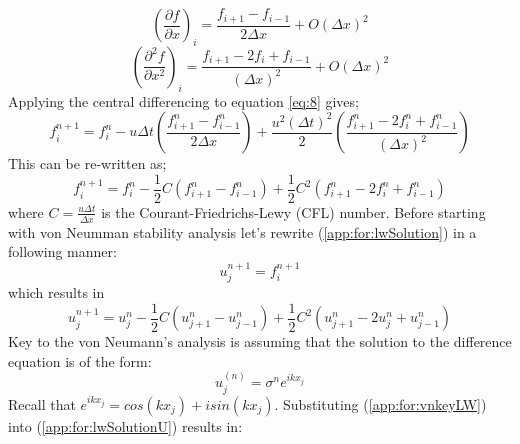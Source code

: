 	\begin{equation}
		\left(\frac{\partial f}{\partial x}\right)_{i} = \frac{f_{i+1} - f_{i-1}}{2\Delta x} + O(\Delta x)^2 
	\end{equation}
	\begin{equation}
		\left(\frac{\partial^2 f}{\partial x^2}\right)_{i} = \frac{f_{i+1} - 2f_{i} + f_{i-1}}{(\Delta x)^2} + O(\Delta x)^2 
	\end{equation} 
	Applying the central differencing to equation \eqref{eq:8} gives;
	\begin{equation}
		f^{n+1}_{i} = f^{n}_{i} - u\Delta t\left(\frac{f^{n}_{i+1} - f^{n}_{i-1}}{2\Delta x}\right) + \frac{u^2(\Delta t)^2}{2}\left(\frac{f^{n}_{i+1} - 2f^{n}_{i} + f^{n}_{i-1}}{(\Delta x)^2}\right)
	\end{equation}
	This can be re-written as;
	\begin{equation}
		\label{app:for:lwSolution}
		f^{n+1}_{i} = f^{n}_{i} -\frac{1}{2}C\left(f^{n}_{i+1} - f^{n}_{i-1}\right) + \frac{1}{2}C^2\left(f^{n}_{i+1} - 2f^{n}_{i} + f^{n}_{i-1}\right)
	\end{equation}
	where $C = \frac{u\Delta t}{\Delta x} $ is the Courant-Friedrichs-Lewy (CFL) number.
	Before starting with von Neumman stability analysis let's rewrite (\ref{app:for:lwSolution}) in a following manner:
	\begin{equation}
		u_j^{n+1} = f_i^{n+1}
	\end{equation}
	which results in
	\begin{equation}
	\label{app:for:lwSolutionU}
		u^{n+1}_{j} = u^{n}_{j} -\frac{1}{2}C\left(u^{n}_{j+1} - u^{n}_{j-1}\right) + \frac{1}{2}C^2\left(u^{n}_{j+1} - 2u^{n}_{j} + u^{n}_{j-1}\right)
	\end{equation}
	Key to the von Neumann's analysis is assuming that the solution to the difference equation is of the form:
	\begin{equation}
		\label{app:for:vnkeyLW}
		u_j^{(n)} = \sigma^ne^{ikx_j}
	\end{equation}	
	Recall that $e^{ikx_j} = cos(kx_j) + isin(kx_j)$. Substituting (\ref{app:for:vnkeyLW}) into (\ref{app:for:lwSolutionU}) results in:
	
